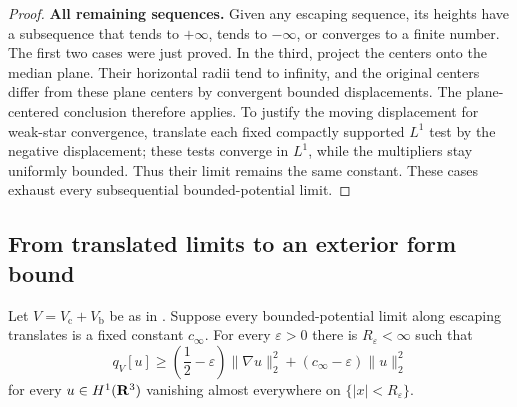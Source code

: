 \begin{proof}
\smallskip\noindent\textbf{All remaining sequences.}
Given any escaping sequence, its heights have a subsequence that tends
to \(+\infty\), tends to \(-\infty\), or converges to a finite number.
The first two cases were just proved.  In the third, project the centers
onto the median plane.  Their horizontal radii tend to infinity, and the
original centers differ from these plane centers by convergent bounded
displacements.  The plane-centered conclusion therefore applies.
To justify the moving displacement for weak-star convergence, translate
each fixed compactly supported \(L^1\) test by the negative displacement;
these tests converge in \(L^1\), while the multipliers stay uniformly
bounded.  Thus their limit remains the same constant.  These cases exhaust
every subsequential bounded-potential limit.
\end{proof}

\subsection{From translated limits to an exterior form bound}

\begin{lemma}
\label{lem:exterior-form-limit}
Let \(V=V_{\mathrm c}+V_{\mathrm b}\) be as in
.  Suppose every bounded-potential
limit along escaping translates is a fixed constant \(c_\infty\).
For every \(\varepsilon>0\) there is \(R_\varepsilon<\infty\) such that
\begin{equation}
 q_V[u]\ge
 \left(\frac12-\varepsilon\right)\|\nabla u\|_2^2
 +(c_\infty-\varepsilon)\|u\|_2^2
 \label{eq:exterior-form-coercivity}
\end{equation}
for every \(u\in H^1(\mathbf R^3)\) vanishing almost everywhere on
\(\{|x|<R_\varepsilon\}\).
\end{lemma}


